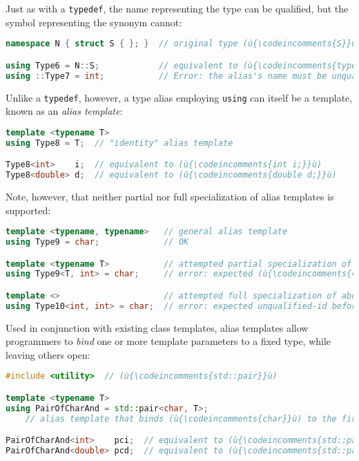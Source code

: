 \noindent Just as with a \lstinline!typedef!, the name representing the type can be
qualified, but the symbol representing the synonym cannot:

\begin{lstlisting}[language=C++]
namespace N { struct S { }; }  // original type (ù{\codeincomments{S}}ù) defined with namespace (ù{\codeincomments{N}}ù)

using Type6 = N::S;            // equivalent to (ù{\codeincomments{typedef N::S Type6;}}ù)
using ::Type7 = int;           // Error: the alias's name must be unqualified.
\end{lstlisting}

\noindent Unlike a \lstinline!typedef!, however, a type alias employing
\lstinline!using! can itself be a template, known as an \emph{alias
template}:

\begin{lstlisting}[language=C++]
template <typename T>
using Type8 = T;  // "identity" alias template

Type8<int>    i;  // equivalent to (ù{\codeincomments{int i;}}ù)
Type8<double> d;  // equivalent to (ù{\codeincomments{double d;}}ù)
\end{lstlisting}

\noindent Note, however, that neither partial nor full specialization of alias
templates is supported:

\begin{lstlisting}[language=C++]
template <typename, typename>   // general alias template
using Type9 = char;             // OK

template <typename T>           // attempted partial specialization of above
using Type9<T, int> = char;     // error: expected (ù{\codeincomments{=}}ù) before (ù{\codeincomments{<}}ù) token

template <>                     // attempted full specialization of above
using Type10<int, int> = char;  // error: expected unqualified-id before (ù{\codeincomments{using}}ù)
\end{lstlisting}

\noindent Used in conjunction with existing class templates, alias templates allow
programmers to \emph{bind} one or more template parameters to a fixed
type, while leaving others open:

\begin{lstlisting}[language=C++]
#include <utility>  // (ù{\codeincomments{std::pair}}ù)

template <typename T>
using PairOfCharAnd = std::pair<char, T>;
    // alias template that binds (ù{\codeincomments{char}}ù) to the first type parameter of (ù{\codeincomments{std::pair}}ù)

PairOfCharAnd<int>    pci;  // equivalent to (ù{\codeincomments{std::pair<char, int> pci;}}ù)
PairOfCharAnd<double> pcd;  // equivalent to (ù{\codeincomments{std::pair<char, double> pcd;}}ù)
\end{lstlisting}

